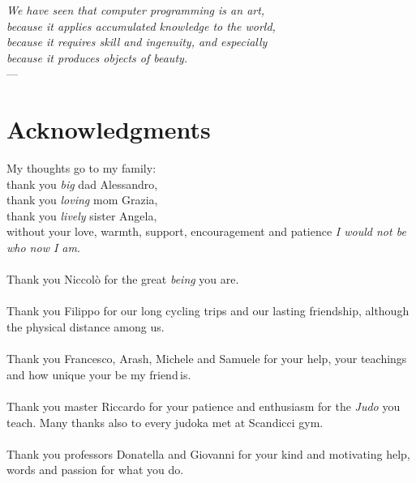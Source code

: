 
\begin{flushright}{\slshape    
    We have seen that computer programming is an art, \\ 
    because it applies accumulated knowledge to the world, \\ 
    because it requires skill and ingenuity, and especially \\
    because it produces objects of beauty.} \\ \medskip
    ---  \citep{knuth:1974}
\end{flushright}



\bigskip

\begingroup
\let\clearpage\relax
\let\cleardoublepage\relax
\let\cleardoublepage\relax

\chapter*{Acknowledgments}

My thoughts go to my family: \\
\indent thank you \emph{big} dad Alessandro, \\
\indent thank you \emph{loving} mom Grazia,\\
\indent thank you  \emph{lively} sister Angela, \\
without your love, warmth, support, encouragement 
and patience \emph{I would not be who now I am}.
\\\\
Thank you Niccol\`o for the great \emph{being} you are.
\\\\
Thank you Filippo for our long cycling trips and our lasting
friendship, although the physical distance among us.
\\\\
Thank you Francesco, Arash, Michele and Samuele for your help,
your teachings and how unique your \flqq be my friend\frqq\,is.
\\\\
Thank you master Riccardo for your patience and enthusiasm
    for the \emph{Judo} you teach. Many thanks also to every judoka met
    at Scandicci gym.
\\\\
Thank you professors Donatella and Giovanni for your kind and motivating help,
words and passion for what you do.

